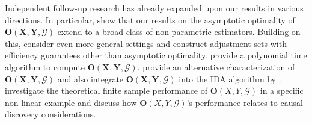 \documentclass[11pt,a4paper]{article}
\theoremstyle{definition}
\theoremstyle{remark}
\newcommand{\mpdag}{maximal PDAG}
\newcommand{\g}[1][G]{\mathcal{#1}}
\newcommand{\opt}[2][X,Y]{\mathbf{O}(#1,#2)}
\newcommand{\optb}[2][X,Y]{\mathbf{O}(\mathbf{#1},#2)}
\begin{document}
Independent follow-up research has already expanded upon our results in various directions. 
In particular, \citet{rotnitzky2019efficient} show that our results on the asymptotic optimality of $\optb{\g}$ extend to a broad class of non-parametric estimators. Building on this, \citet{smucler2020efficient} consider even more general settings and construct adjustment sets with efficiency guarantees other than asymptotic optimality.
\citet{ZanderL19} provide a polynomial time algorithm to compute $\optb{\g}$. 
\citet{outcomeIDA} provide an alternative characterization of $\optb{\g}$ and also integrate $\optb{\g}$ into the IDA algorithm by \citet{maathuis2009estimating}. \citet{kuipers2020variance} investigate the theoretical finite sample performance of $\opt{\g}$ in a specific non-linear example and discuss how $\opt{\g}$'s performance relates to causal discovery considerations. 



%
%
%
%
%
%
%
%
\end{document}
